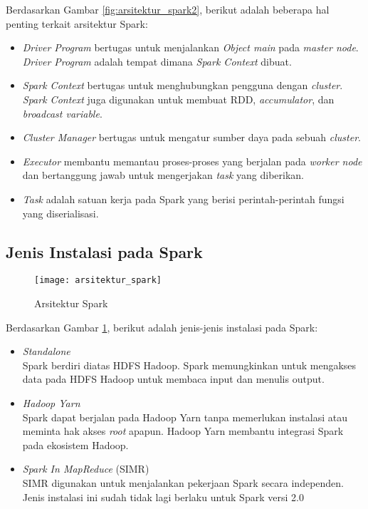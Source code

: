 Berdasarkan Gambar \ref{fig:arsitektur_spark2}, berikut adalah beberapa hal penting terkait arsitektur Spark:

\begin{itemize}

\item \textit{Driver Program} bertugas untuk menjalankan \textit{Object main} pada \textit{master node}. \textit{Driver Program} adalah tempat dimana \textit{Spark Context} dibuat.

\item \textit{Spark Context} bertugas untuk menghubungkan pengguna dengan \textit{cluster}. \textit{Spark Context} juga digunakan untuk membuat RDD, \textit{accumulator}, dan \textit{broadcast variable}.

\item \textit{Cluster Manager} bertugas untuk mengatur sumber daya pada sebuah \textit{cluster}.

\item \textit{Executor} membantu memantau proses-proses yang berjalan pada \textit{worker node} dan bertanggung jawab untuk mengerjakan \textit{task} yang diberikan.

\item \textit{Task} adalah satuan kerja pada Spark yang berisi perintah-perintah fungsi yang diserialisasi.

\end{itemize}


\subsection{Jenis Instalasi pada Spark}
\label{sec:instalasi_spark}
\begin{figure}[H]
	\centering
	\texttt{[image: arsitektur\_spark]}
	\caption{Arsitektur Spark}
	\label{fig:arsitektur_spark}
\end{figure}

Berdasarkan Gambar \ref{fig:arsitektur_spark}, berikut adalah jenis-jenis instalasi pada Spark:

\begin{itemize}
\item \textit{Standalone}\\  
Spark berdiri diatas HDFS Hadoop. Spark memungkinkan untuk mengakses data pada HDFS Hadoop untuk membaca input dan menulis output.

\item \textit{Hadoop Yarn}\\
Spark dapat berjalan pada Hadoop Yarn tanpa memerlukan instalasi atau meminta hak akses \textit{root} apapun. Hadoop Yarn membantu integrasi Spark pada ekosistem Hadoop.

\item \textit{Spark In MapReduce} (SIMR)\\ 
SIMR digunakan untuk menjalankan pekerjaan Spark secara independen. Jenis instalasi ini sudah tidak lagi berlaku untuk Spark versi 2.0
\end{itemize}

